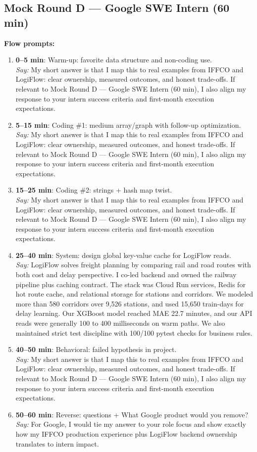 \documentclass[9pt,a4paper]{article}
\begin{document}
\subsection{Mock Round D --- Google SWE Intern (60 min)}
\textbf{Flow prompts:}
\begin{enumerate}
  \item \textbf{0--5 min}: Warm-up: favorite data structure and non-coding use.\\
  \textit{Say:} My short answer is that I map this to real examples from IFFCO and LogiFlow: clear ownership, measured outcomes, and honest trade-offs. If relevant to Mock Round D --- Google SWE Intern (60 min), I also align my response to your intern success criteria and first-month execution expectations.
  \item \textbf{5--15 min}: Coding \#1: medium array/graph with follow-up optimization.\\
  \textit{Say:} My short answer is that I map this to real examples from IFFCO and LogiFlow: clear ownership, measured outcomes, and honest trade-offs. If relevant to Mock Round D --- Google SWE Intern (60 min), I also align my response to your intern success criteria and first-month execution expectations.
  \item \textbf{15--25 min}: Coding \#2: strings + hash map twist.\\
  \textit{Say:} My short answer is that I map this to real examples from IFFCO and LogiFlow: clear ownership, measured outcomes, and honest trade-offs. If relevant to Mock Round D --- Google SWE Intern (60 min), I also align my response to your intern success criteria and first-month execution expectations.
  \item \textbf{25--40 min}: System: design global key-value cache for LogiFlow reads.\\
  \textit{Say:} LogiFlow solves freight planning by comparing rail and road routes with both cost and delay perspective. I co-led backend and owned the railway pipeline plus caching contract. The stack was Cloud Run services, Redis for hot route cache, and relational storage for stations and corridors. We modeled more than 580 corridors over 9,526 stations, and used 15,650 train-days for delay learning. Our XGBoost model reached MAE 22.7 minutes, and our API reads were generally 100 to 400 milliseconds on warm paths. We also maintained strict test discipline with 100/100 pytest checks for business rules.
  \item \textbf{40--50 min}: Behavioral: failed hypothesis in project.\\
  \textit{Say:} My short answer is that I map this to real examples from IFFCO and LogiFlow: clear ownership, measured outcomes, and honest trade-offs. If relevant to Mock Round D --- Google SWE Intern (60 min), I also align my response to your intern success criteria and first-month execution expectations.
  \item \textbf{50--60 min}: Reverse: questions + What Google product would you remove?\\
  \textit{Say:} For Google, I would tie my answer to your role focus and show exactly how my IFFCO production experience plus LogiFlow backend ownership translates to intern impact.
\end{enumerate}
\end{document}
